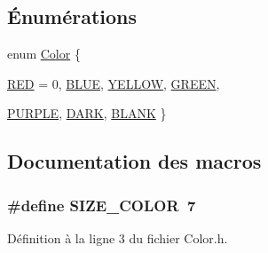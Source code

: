 \subsection*{Énumérations}
\begin{DoxyCompactItemize}
\item 
enum \hyperlink{a00019_ab87bacfdad76e61b9412d7124be44c1c}{Color} \{ \par
\hyperlink{a00019_ab87bacfdad76e61b9412d7124be44c1caf80f9a890089d211842d59625e561f88}{RED} = 0, 
\hyperlink{a00019_ab87bacfdad76e61b9412d7124be44c1ca35d6719cb4d7577c031b3d79057a1b79}{BLUE}, 
\hyperlink{a00019_ab87bacfdad76e61b9412d7124be44c1cae735a848bf82163a19236ead1c3ef2d2}{YELLOW}, 
\hyperlink{a00019_ab87bacfdad76e61b9412d7124be44c1caa60bd322f93178d68184e30e162571ca}{GREEN}, 
\par
\hyperlink{a00019_ab87bacfdad76e61b9412d7124be44c1ca2772ad7cd64f03c2aed60f91c69fa69d}{PURPLE}, 
\hyperlink{a00019_ab87bacfdad76e61b9412d7124be44c1ca5564de0baf1f25257db17367eba68edd}{DARK}, 
\hyperlink{a00019_ab87bacfdad76e61b9412d7124be44c1ca9eea16b4e105c96853a3a4cb462cc3a4}{BLANK}
 \}
\end{DoxyCompactItemize}


\subsection{Documentation des macros}
\hypertarget{a00019_a442be7a0863fb7165d1043f3de8fff8e}{
\subsubsection[{SIZE\_\-COLOR}]{\setlength{\rightskip}{0pt plus 5cm}\#define SIZE\_\-COLOR~7}}
\label{a00019_a442be7a0863fb7165d1043f3de8fff8e}


Définition à la ligne 3 du fichier Color.h.



